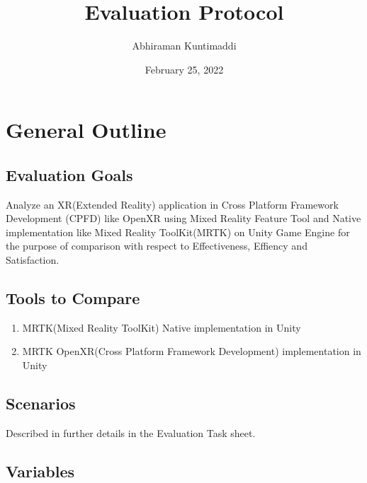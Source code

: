 \documentclass{article}
\title{\textbf{Evaluation Protocol}}
\author{Abhiraman Kuntimaddi}
\date{February 25, 2022}
\begin{document}
\maketitle

\section{General Outline}

\subsection{Evaluation Goals}

Analyze an XR(Extended Reality) application in Cross Platform Framework Development (CPFD)
like OpenXR using Mixed Reality Feature Tool and Native implementation like Mixed Reality ToolKit(MRTK)
on Unity Game Engine for the purpose of comparison with respect to Effectiveness, Effiency and Satisfaction.

\subsection{Tools to Compare}

\begin{enumerate}[label=\textbf{\alph*}]
	\item MRTK(Mixed Reality ToolKit) Native implementation in Unity
	\item MRTK OpenXR(Cross Platform Framework Development) implementation in Unity
\end{enumerate}

\subsection{Scenarios}

Described in further details in the Evaluation Task sheet.

\subsection{Variables}
\end{document}
